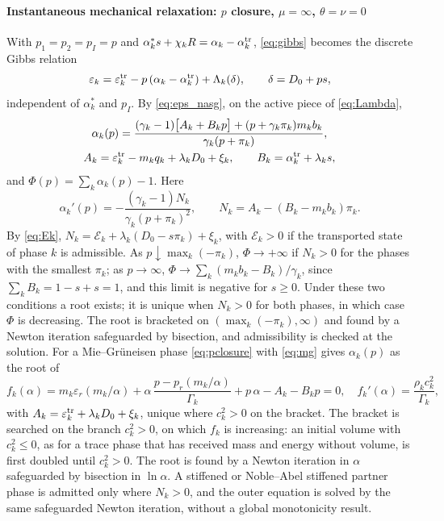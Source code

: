 \paragraph{Instantaneous mechanical relaxation: $p$ closure, $\mu=\infty$, $\theta=\nu=0$}
With $p_1=p_2=p_I=p$ and $\alpha^*_ks+\chi_kR=\alpha_k-\alpha^{\rm tr}_k$, \eqref{eq:gibbs} becomes the discrete Gibbs relation
\begin{equation}
\varepsilon_k=\varepsilon^{\rm tr}_k-p\,(\alpha_k-\alpha^{\rm tr}_k)+\Lambda_k(\delta),\qquad \delta=D_0+ps ,
\label{eq:pclosure}
\end{equation}
independent of $\alpha^*_k$ and $p_I$. By \eqref{eq:eps_nasg}, on the active piece of \eqref{eq:Lambda},
\begin{equation}
\begin{gathered}
\alpha_k(p)=\frac{(\gamma_k-1)\big[A_k+B_kp\big]+(p+\gamma_k\pi_k)m_kb_k}{\gamma_k(p+\pi_k)},\\
A_k=\varepsilon^{\rm tr}_k-m_kq_k+\lambda_kD_0+\xi_k,\qquad B_k=\alpha^{\rm tr}_k+\lambda_ks ,
\end{gathered}
\label{eq:alpha_p}
\end{equation}
and $\Phi(p)=\sum_k\alpha_k(p)-1$. Here
\[
\alpha_k'(p)=-\frac{(\gamma_k-1)N_k}{\gamma_k(p+\pi_k)^2},\qquad N_k=A_k-(B_k-m_kb_k)\pi_k .
\]
By \eqref{eq:Ek}, $N_k=\mathcal E_k+\lambda_k(D_0-s\pi_k)+\xi_k$, with $\mathcal E_k>0$ if the transported state of phase $k$ is admissible.
As $p\downarrow\max_k(-\pi_k)$, $\Phi\to+\infty$ if $N_k>0$ for the phases with the smallest $\pi_k$; as $p\to\infty$,
$\Phi\to\sum_k(m_kb_k-B_k)/\gamma_k$, since $\sum_kB_k=1-s+s=1$, and this limit is negative for $s\ge0$. Under these two
conditions a root exists; it is unique when $N_k>0$ for both phases, in which case $\Phi$ is decreasing. The root is
bracketed on $(\max_k(-\pi_k),\infty)$ and found by a Newton iteration safeguarded by bisection, and admissibility is checked at the
solution. For a Mie--Gr\"uneisen phase \eqref{eq:pclosure} with \eqref{eq:mg} gives $\alpha_k(p)$ as the root of
\[
f_k(\alpha)=m_k\varepsilon_r(m_k/\alpha)+\alpha\,\frac{p-p_r(m_k/\alpha)}{\Gamma_k}+p\,\alpha-A_k-B_kp=0,\quad
f_k'(\alpha)=\frac{\rho_kc_k^2}{\Gamma_k} ,
\]
with $A_k=\varepsilon^{\rm tr}_k+\lambda_kD_0+\xi_k$, unique where $c_k^2>0$ on the bracket. The bracket is searched on the branch
$c_k^2>0$, on which $f_k$ is increasing: an initial volume with $c_k^2\le0$, as for a trace phase that has received mass and energy
without volume, is first doubled until $c_k^2>0$. The root is found by a Newton iteration in $\alpha$ safeguarded by bisection
in $\ln\alpha$. A stiffened or Noble--Abel stiffened partner phase is admitted only where $N_k>0$, and the outer
equation is solved by the same safeguarded Newton iteration, without a global monotonicity result.

